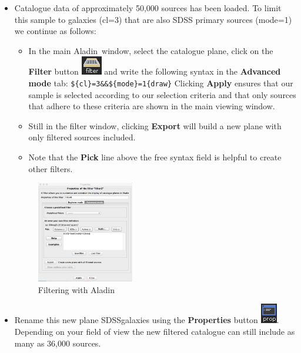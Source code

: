 \documentclass [a4paper, 12pt]{article}
\newcommand{\aladin}{{\textsc{A}{ladin}}}
\begin{document}
\begin{itemize}
\item Catalogue data of approximately 50,000 sources has been loaded. To 
limit this sample to galaxies (cl=3) that are also SDSS primary sources 
(mode=1) we continue as follows:
\begin{itemize}
    \item In the main \aladin\ window, select the catalogue plane, click on the 
    \textbf{Filter} button  \includegraphics[width=0.04  
    \textwidth]{../images/aladin_button_filter.png} and write the following 
    syntax in the \textbf{Advanced mode} tab: \newline
    \texttt{\$\{cl\}=3\&\&\$\{mode\}=1\{draw\}} \newline
    Clicking \textbf{Apply} ensures that our sample is selected according to 
    our selection criteria and that only sources that adhere to these criteria 
    are shown in the main viewing window. 
    \item Still in the filter window, clicking \textbf{Export} will build a new 
    plane with only filtered sources included.
    \item Note that the \textbf{Pick} line above the free syntax field is 
    helpful to create other filters.
\end{itemize}

\begin{figure}[H]
\center
\includegraphics[width=0.4\textwidth]{../images/aladin_filter_galaxies-sdss.jpg}
\caption{Filtering with \aladin}
\label{fig:aladinfilter}
\end{figure}

\item Rename this new plane SDSSgalaxies using the \textbf{Properties} button  
\includegraphics[width=0.03
\textwidth]{../images/aladin_button_properties.png}. Depending on your field of 
view the new filtered catalogue can still include as many as 36,000 sources.


\end{itemize}
\end{document}
